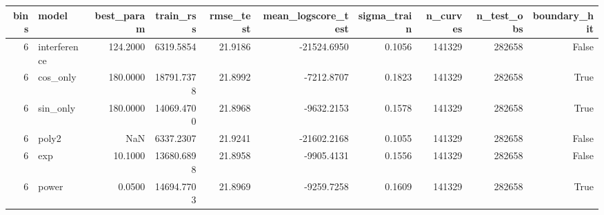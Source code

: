 \begin{tabular}{rlrrrrrrrr}
\toprule
bins & model & best_param & train_rss & rmse_test & mean_logscore_test & sigma_train & n_curves & n_test_obs & boundary_hit \\
\midrule
6 & interference & 124.2000 & 6319.5854 & 21.9186 & -21524.6950 & 0.1056 & 141329 & 282658 & False \\
6 & cos_only & 180.0000 & 18791.7378 & 21.8992 & -7212.8707 & 0.1823 & 141329 & 282658 & True \\
6 & sin_only & 180.0000 & 14069.4700 & 21.8968 & -9632.2153 & 0.1578 & 141329 & 282658 & True \\
6 & poly2 & NaN & 6337.2307 & 21.9241 & -21602.2168 & 0.1055 & 141329 & 282658 & False \\
6 & exp & 10.1000 & 13680.6898 & 21.8958 & -9905.4131 & 0.1556 & 141329 & 282658 & False \\
6 & power & 0.0500 & 14694.7703 & 21.8969 & -9259.7258 & 0.1609 & 141329 & 282658 & True \\
\bottomrule
\end{tabular}
